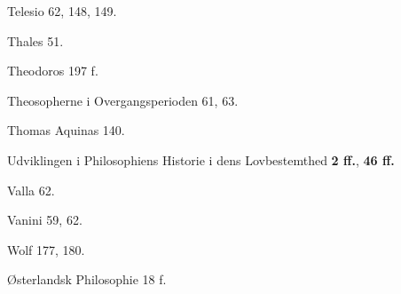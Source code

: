 \begin{list}{}
\vspace{0.5\baselineskip}
\item Telesio 62, 148, 149.
\item Thales 51.
\item Theodoros 197 f.
\item Theosopherne i Overgangsperioden 61, 63.
\item Thomas Aquinas 140.

\vspace{0.5\baselineskip}
\item Udviklingen i Philosophiens Historie i dens Lovbestemthed
  \textbf{2 ff.}, \textbf{46 ff.}

\vspace{0.5\baselineskip}
\item Valla 62.
\item Vanini 59, 62.

\vspace{0.5\baselineskip}
\item Wolf 177, 180.

\vspace{0.5\baselineskip}
\item Østerlandsk Philosophie 18 f.

\end{list}
\endgroup

\divrule


